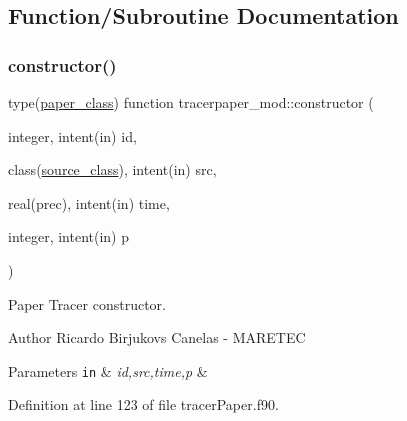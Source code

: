 \subsection{Function/\+Subroutine Documentation}
\mbox{\label{namespacetracerpaper__mod_ad1bbc9d4e889b6aab71f0333cf6a5365}} 
\subsubsection{\texorpdfstring{constructor()}{constructor()}}
{\footnotesize\ttfamily type(\mbox{\hyperlink{structtracerpaper__mod_1_1paper__class}{paper\+\_\+class}}) function tracerpaper\+\_\+mod\+::constructor (\begin{DoxyParamCaption}\item[{integer, intent(in)}]{id,  }\item[{class(\mbox{\hyperlink{structsources__mod_1_1source__class}{source\+\_\+class}}), intent(in)}]{src,  }\item[{real(prec), intent(in)}]{time,  }\item[{integer, intent(in)}]{p }\end{DoxyParamCaption})\hspace{0.3cm}{\ttfamily [private]}}



Paper Tracer constructor. 

\begin{DoxyAuthor}{Author}
Ricardo Birjukovs Canelas -\/ M\+A\+R\+E\+T\+EC 
\end{DoxyAuthor}

\begin{DoxyParams}[1]{Parameters}
\mbox{\tt in}  & {\em id,src,time,p} & \\
\hline
\end{DoxyParams}


Definition at line 123 of file tracer\+Paper.\+f90.


